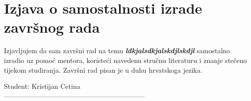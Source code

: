 \chapter*{Izjava o samostalnosti izrade završnog rada}
Izjavljujem da sam završni rad na temu \textbf{\emph{ldkjalsdkjalskdjlskdjl}} samostalno izradio uz pomoć mentora,  koristeći navedenu stručnu literaturu i znanje stečeno tijekom studiranja.
Završni rad pisan je u duhu hrvatskoga jezika.
\vspace{\fill}
\begin{flushright}
Student: Kristijan Cetina\\
\vspace{15mm}
--------------------------------------------------------------
\end{flushright}